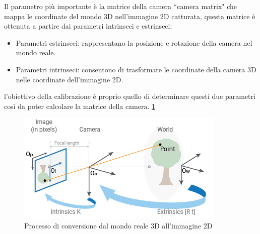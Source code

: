 \documentclass[12pt,a4paper,openright,twoside]{book}
\begin{document}
Il parametro più importante è la matrice della camera ``camera matrix" che mappa le coordinate del mondo 3D nell'immagine 2D catturata, questa matrice è ottenuta a partire dai parametri intrinseci e estrinseci:
\begin{itemize}
	\item Parametri estrinseci: rappresentano la posizione e rotazione della camera nel mondo reale.
	\item Parametri intrinseci: consentono di trasformare le coordinate della camera 3D nelle coordinate dell'immagine 2D.
\end{itemize}
l'obiettivo della calibrazione è proprio quello di determinare questi due parametri così da poter calcolare la matrice della camera. \ref{fig:calibration_cameramodel_coords}
\begin{figure}
	\centering
	\includegraphics[width=0.5\linewidth]{./figures/calibration-cameramodel-coords.png}
	\caption{Processo di conversione dal mondo reale 3D all'immagine 2D}
	\label{fig:calibration_cameramodel_coords}
\end{figure}
\end{document}
